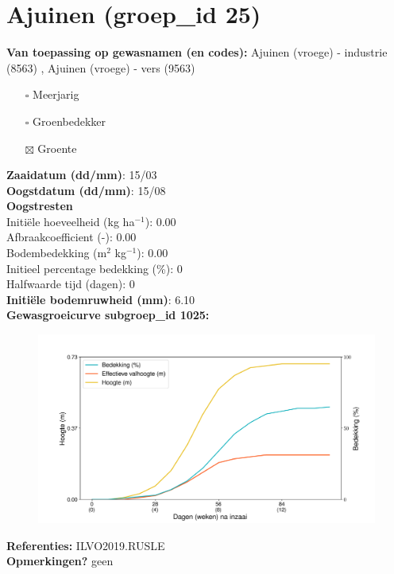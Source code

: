 \documentclass{article}
\begin{document}
 \section{Ajuinen (groep\_id 25)} 
 \textbf{Van toepassing op gewasnamen (en codes):} Ajuinen (vroege) - industrie (8563) , Ajuinen (vroege) - vers (9563) 
 \begin{multicols}{3} \begin{itemize} \item[$\square$] Meerjarig \item[$\square$] Groenbedekker \item[$\boxtimes$] Groente \end{itemize} \end{multicols} 
  \textbf{Zaaidatum (dd/mm)}: 15/03  \vspace{0.10cm} \\ 
  \textbf{Oogstdatum (dd/mm)}: 15/08  \vspace{0.10cm} \\ 
  \textbf{Oogstresten} \vspace{0.05cm} \\ 
  \tab Initi\"{e}le hoeveelheid (kg ha$^{-1}$): 0.00 \vspace{0.05cm} \\ 
  \tab Afbraakcoefficient (-): 0.00 \vspace{0.05cm} \\ 
  \tab Bodembedekking (m$^2$ kg$^{-1}$): 0.00 \vspace{0.05cm} \\ 
  \tab Initieel percentage bedekking (\%): 0 \vspace{0.05cm} \\ 
  \tab Halfwaarde tijd (dagen): 0 \vspace{0.05cm} \\ 
  \textbf{Initi\"{e}le bodemruwheid (mm)}: 6.10 \vspace{0.05cm} \\ 
  \textbf{Gewasgroeicurve subgroep\_id 1025:} 
 \begin{center} \begin{figure}[H] \includegraphics[width=12.5cm]{temp/1025.png} \end{figure} \end{center} 
  \textbf{Referenties:} ILVO2019.RUSLE \vspace{0.10cm} \\ 
  \textbf{Opmerkingen?} geen \vspace{0.10cm} \\ 
 \newpage 
\end{document}
